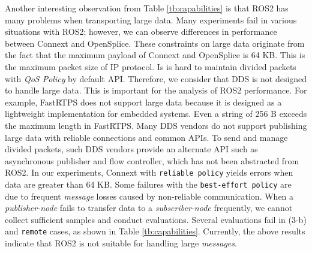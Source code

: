 \documentclass{sig-alternate-05-2015}
\begin{document}
Another interesting observation from Table \ref{tb:capabilities} is that ROS2 has many problems when transporting large data.
Many experiments fail in various situations with ROS2; however, we can observe differences in performance between Connext and OpenSplice.
These constraints on large data originate from the fact that the maximum payload of Connext and OpenSplice is 64 KB.
This is the maximum packet size of IP protocol.
Is is hard to maintain divided packets with \emph{QoS Policy} by default API.
Therefore, we consider that DDS is not designed to handle large data.
This is important for the analysis of ROS2 performance.
For example, FastRTPS does not support large data because it is designed as a lightweight implementation for embedded systems. 
Even a string of 256 B exceeds the maximum length in FastRTPS.
Many DDS vendors do not support publishing large data with reliable connections and common APIs.
To send and manage divided packets, such DDS vendors provide an alternate API such as asynchronous publisher and flow controller, which has not been abstracted from ROS2. 
In our experiments, Connext with \texttt{reliable policy} yields errors when data are greater than 64 KB.
Some failures with the \texttt{best-effort policy} are due to frequent \emph{message} losses caused by non-reliable communication. 
When a \emph{publisher-node} fails to transfer data to a \emph{subscriber-node} frequently, we cannot collect sufficient samples and conduct evaluations.
Several evaluations fail in (3-b) and \texttt{remote} cases, as shown in Table \ref{tb:capabilities}.
Currently, the above results indicate that ROS2 is not suitable for handling large \emph{messages}.
\end{document}
